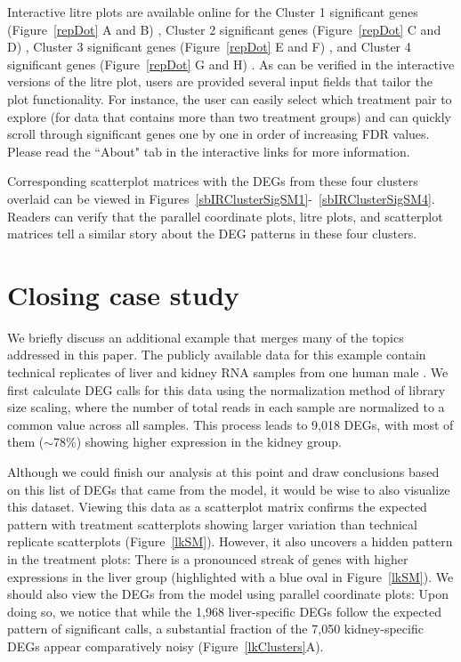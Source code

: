 \documentclass{bmcart}
\begin{document}
\begin{linenumbers}
\begin{doublespacing}
Interactive litre plots are available online for the Cluster 1 significant genes (Figure~\ref{repDot} A and B) \cite{litrecluster1}, Cluster 2 significant genes (Figure~\ref{repDot} C and D) \cite{litrecluster2}, Cluster 3 significant genes (Figure~\ref{repDot} E and F) \cite{litrecluster3}, and Cluster 4 significant genes (Figure~\ref{repDot} G and H) \cite{litrecluster4}. As can be verified in the interactive versions of the litre plot, users are provided several input fields that tailor the plot functionality. For instance, the user can easily select which treatment pair to explore (for data that contains more than two treatment groups) and can quickly scroll through significant genes one by one in order of increasing FDR values. Please read the ``About" tab in the interactive links for more information.

Corresponding scatterplot matrices with the DEGs from these four clusters overlaid can be viewed in Figures~\ref{sbIRClusterSigSM1}-~\ref{sbIRClusterSigSM4}. Readers can verify that the parallel coordinate plots, litre plots, and scatterplot matrices tell a similar story about the DEG patterns in these four clusters.

\section*{Closing case study}

We briefly discuss an additional example that merges many of the topics addressed in this paper. The publicly available data for this example contain technical replicates of liver and kidney RNA samples from one human male \cite{Marioni}. We first calculate DEG calls for this data using the normalization method of library size scaling, where the number of total reads in each sample are normalized to a common value across all samples. This process leads to 9,018 DEGs, with most of them ($\sim$78\%) showing higher expression in the kidney group.

Although we could finish our analysis at this point and draw conclusions based on this list of DEGs that came from the model, it would be wise to also visualize this dataset. Viewing this data as a scatterplot matrix confirms the expected pattern with treatment scatterplots showing larger variation than technical replicate scatterplots (Figure~\ref{lkSM}). However, it also uncovers a hidden pattern in the treatment plots: There is a pronounced streak of genes with higher expressions in the liver group (highlighted with a blue oval in Figure~\ref{lkSM}). We should also view the DEGs from the model using parallel coordinate plots: Upon doing so, we notice that while the 1,968 liver-specific DEGs follow the expected pattern of significant calls, a substantial fraction of the 7,050 kidney-specific DEGs appear comparatively noisy (Figure~\ref{lkClusters}A).


\end{doublespacing}
\end{linenumbers}
\end{document}
